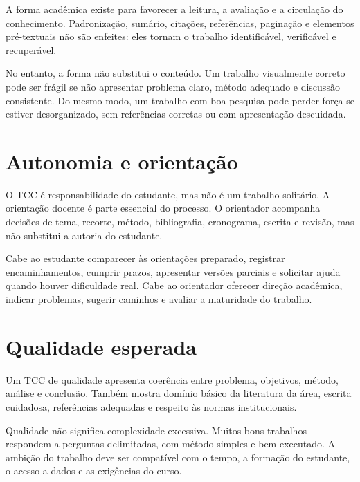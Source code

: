 A forma acadêmica existe para favorecer a leitura, a avaliação e a circulação do conhecimento. Padronização, sumário, citações, referências, paginação e elementos pré-textuais não são enfeites: eles tornam o trabalho identificável, verificável e recuperável.

No entanto, a forma não substitui o conteúdo. Um trabalho visualmente correto pode ser frágil se não apresentar problema claro, método adequado e discussão consistente. Do mesmo modo, um trabalho com boa pesquisa pode perder força se estiver desorganizado, sem referências corretas ou com apresentação descuidada.


\section{Autonomia e orientação}

O TCC é responsabilidade do estudante, mas não é um trabalho solitário. A orientação docente é parte essencial do processo. O orientador acompanha decisões de tema, recorte, método, bibliografia, cronograma, escrita e revisão, mas não substitui a autoria do estudante.

Cabe ao estudante comparecer às orientações preparado, registrar encaminhamentos, cumprir prazos, apresentar versões parciais e solicitar ajuda quando houver dificuldade real. Cabe ao orientador oferecer direção acadêmica, indicar problemas, sugerir caminhos e avaliar a maturidade do trabalho.

\section{Qualidade esperada}

Um TCC de qualidade apresenta coerência entre problema, objetivos, método, análise e conclusão. Também mostra domínio básico da literatura da área, escrita cuidadosa, referências adequadas e respeito às normas institucionais.

Qualidade não significa complexidade excessiva. Muitos bons trabalhos respondem a perguntas delimitadas, com método simples e bem executado. A ambição do trabalho deve ser compatível com o tempo, a formação do estudante, o acesso a dados e as exigências do curso.

